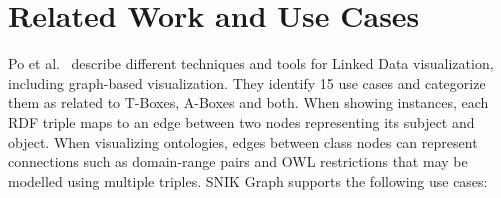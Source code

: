 \documentclass[conference]{IEEEtran}
\begin{document}
%



\label{sec:relatedwork}
\section{Related Work and Use Cases}
Po et al.~\cite{linkeddatavisualization} describe different techniques and tools for Linked Data visualization, including graph-based visualization.
They identify 15 use cases and categorize them as related to T-Boxes, A-Boxes and both.
When showing instances, each RDF triple maps to an edge between two nodes representing its subject and object.
When visualizing ontologies, edges between class nodes can represent connections such as domain-range pairs and OWL restrictions that may be modelled using multiple triples.
SNIK Graph supports the following use cases:
\end{document}
